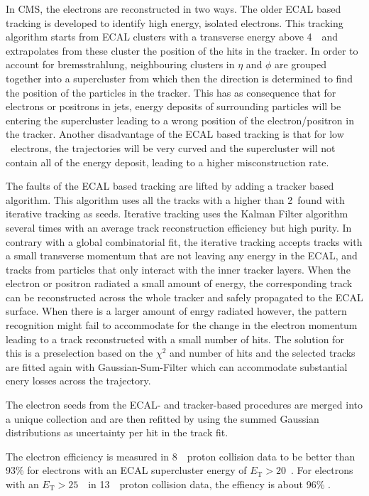 In CMS, the electrons are reconstructed in two ways. The older ECAL based tracking is developed to identify high energy, isolated electrons. This tracking algorithm starts from ECAL clusters with a transverse energy above 4~\GeV\ and extrapolates from these cluster the position of the hits in the tracker. In order to account for bremsstrahlung, neighbouring clusters in $\eta$ and $\phi$
are grouped together into a supercluster from which then the direction is determined to find the position of the particles in the tracker. This has as consequence that for electrons or positrons in jets, energy deposits of surrounding particles will be entering the supercluster leading to a wrong position of the electron/positron in the tracker. Another disadvantage of the ECAL based tracking is that for low \pt\ electrons, the trajectories will be very curved and the supercluster will not contain all of the energy deposit, leading to a higher misconstruction rate. 

The faults of the ECAL based tracking are lifted by adding a tracker based algorithm. This algorithm uses all the tracks with a \pt higher than 2~\GeV found with iterative tracking as seeds. Iterative tracking uses the Kalman Filter algorithm several times with an average track reconstruction efficiency but high purity. In contrary with a global combinatorial fit, the iterative tracking accepts tracks with a small transverse momentum that are not leaving any energy in the ECAL, and tracks from particles that only interact with the inner tracker layers. When the electron or positron radiated a small amount of energy, the corresponding track can be reconstructed across the whole tracker and safely propagated to the ECAL surface. When there is a larger amount of enrgy radiated however, the pattern recognition might fail  to accommodate for the change in the electron momentum leading to a track reconstructed with a small number of hits. The solution for this is a preselection based on the $\chi^2$ and number of hits and the selected tracks are fitted again with Gaussian-Sum-Filter which can accommodate substantial enery losses across the trajectory. 

The electron seeds from the ECAL- and tracker-based procedures are merged into a unique collection and are then refitted  by using the summed Gaussian distributions as uncertainty per hit in the track fit. 

The electron efficiency is measured in 8~\TeV\ proton collision data to be better than 93\% for electrons with an ECAL supercluster energy of $E_{\mathrm{T}}>20$~\GeV \todocite. For electrons with an  $E_{\mathrm{T}}>25$~\GeV\  in 13~\TeV\ proton collision data, the effiency is about 96\% \todocite.

